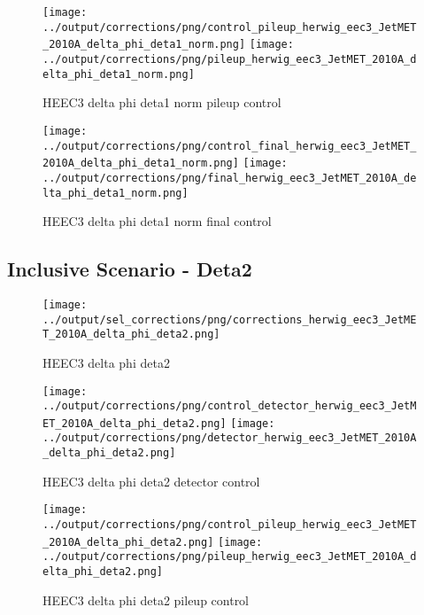 \documentclass[11pt]{book}
\begin{document}
\begin{figure}[ht]
\centering
\texttt{[image: ../output/corrections/png/control\_pileup\_herwig\_eec3\_JetMET\_2010A\_delta\_phi\_deta1\_norm.png]}
\texttt{[image: ../output/corrections/png/pileup\_herwig\_eec3\_JetMET\_2010A\_delta\_phi\_deta1\_norm.png]}
\caption{HEEC3 delta phi deta1 norm pileup control}
\label{fig:HEEC3_JetMET_2010A_delta_phi_deta1_norm_pileup_control}
\end{figure}


\begin{figure}[ht]
\centering
\texttt{[image: ../output/corrections/png/control\_final\_herwig\_eec3\_JetMET\_2010A\_delta\_phi\_deta1\_norm.png]}
\texttt{[image: ../output/corrections/png/final\_herwig\_eec3\_JetMET\_2010A\_delta\_phi\_deta1\_norm.png]}
\caption{HEEC3 delta phi deta1 norm final control}
\label{fig:HEEC3_JetMET_2010A_delta_phi_deta1_norm_final_control}
\end{figure}


\clearpage
\subsection{Inclusive Scenario - Deta2}

\begin{figure}[ht]
\centering
\texttt{[image: ../output/sel\_corrections/png/corrections\_herwig\_eec3\_JetMET\_2010A\_delta\_phi\_deta2.png]}
\caption{HEEC3 delta phi deta2}
\label{fig:HEEC3_JetMET_2010A_delta_phi_deta2}
\end{figure}


\begin{figure}[ht]
\centering
\texttt{[image: ../output/corrections/png/control\_detector\_herwig\_eec3\_JetMET\_2010A\_delta\_phi\_deta2.png]}
\texttt{[image: ../output/corrections/png/detector\_herwig\_eec3\_JetMET\_2010A\_delta\_phi\_deta2.png]}
\caption{HEEC3 delta phi deta2 detector control}
\label{fig:HEEC3_JetMET_2010A_delta_phi_deta2_detector_control}
\end{figure}

\begin{figure}[ht]
\centering
\texttt{[image: ../output/corrections/png/control\_pileup\_herwig\_eec3\_JetMET\_2010A\_delta\_phi\_deta2.png]}
\texttt{[image: ../output/corrections/png/pileup\_herwig\_eec3\_JetMET\_2010A\_delta\_phi\_deta2.png]}
\caption{HEEC3 delta phi deta2 pileup control}
\label{fig:HEEC3_JetMET_2010A_delta_phi_deta2_pileup_control}
\end{figure}
\end{document}
